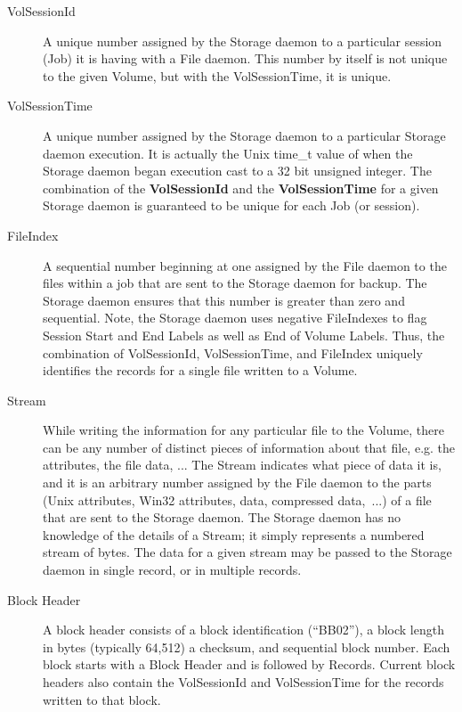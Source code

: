 \begin{description}
\item [VolSessionId]
   A unique number assigned by the Storage daemon  to a particular session (Job)
it is having with a File  daemon. This number by itself is not unique to the
given Volume, but with the VolSessionTime, it is unique.

\item [VolSessionTime]
   A unique number assigned by the Storage daemon  to a particular Storage daemon
execution. It is actually  the Unix time\_t value of when the Storage daemon
began  execution cast to a 32 bit unsigned integer. The combination  of the
{\bf VolSessionId} and the {\bf VolSessionTime}  for a given Storage daemon is
guaranteed to be unique for each  Job (or session).

\item [FileIndex]
   A sequential number beginning at one assigned by the File  daemon to the files
within a job that are sent to the Storage daemon  for backup. The Storage
daemon ensures that this number  is greater than zero and sequential. Note,
the Storage  daemon uses negative FileIndexes to flag Session Start  and End
Labels as well as End of Volume Labels. Thus, the  combination of
VolSessionId, VolSessionTime, and FileIndex  uniquely identifies the records
for a single file written  to a Volume.

\item [Stream]
   While writing the information for any particular  file to the Volume, there
can be any number of distinct  pieces of information about that file, e.g. the
attributes,  the file data, ... The Stream indicates what piece of data  it
is, and it is an arbitrary number assigned by the File daemon to the  parts
(Unix attributes, Win32 attributes, data, compressed data,\ ...) of a file
that are sent to  the Storage daemon. The Storage daemon has no knowledge of
the details of a Stream; it simply represents a numbered  stream of bytes. The
data for a given stream may be  passed to the Storage daemon in single record,
or in multiple  records.

\item [Block Header]
   A block header consists of a block identification  (``BB02''), a block length
in bytes (typically  64,512) a checksum, and sequential block number.  Each
block starts with a Block Header and is followed  by Records. Current block
headers also contain the VolSessionId  and VolSessionTime for the records
written to that block.


\end{description}
